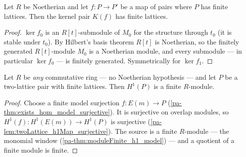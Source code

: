 \begin{lemma}
  \label{pa-lem:moduleFinite_aeval_kernelPair}
  \leanok

  Let \(R\) be Noetherian and let \(f : P \to P'\) be a map of pairs where \(P\) has
  finite lattices. Then the kernel pair \(K(f)\) has finite lattices.
\end{lemma}
\begin{proof}
  \leanok
  \(\ker f_0\) is an \(R[t]\)-submodule of \(M_0\) for the structure through \(t_0\)
  (it is stable under \(t_0\)). By Hilbert's basis theorem \(R[t]\) is Noetherian, so
  the finitely generated \(R[t]\)-module \(M_0\) is a Noetherian module, and every
  submodule --- in particular \(\ker f_0\) --- is finitely generated. Symmetrically
  for \(\ker f_1\).
\end{proof}

\begin{theorem}
  \label{pa-thm:twoLattice_coh1}
  \leanok

  Let \(R\) be \emph{any} commutative ring --- no Noetherian hypothesis --- and let
  \(P\) be a two-lattice pair with finite lattices. Then \(H^1(P)\) is a finite
  \(R\)-module.
\end{theorem}
\begin{proof}
  \leanok
  Choose a finite model surjection \(f : E(m) \to P\)
  (\ref{pa-thm:exists_hom_model_surjective}). It is surjective on overlap modules, so
  \(H^1(f) : H^1(E(m)) \to H^1(P)\) is surjective
  (\ref{pa-lem:twoLattice_h1Map_surjective}). The source is a finite \(R\)-module --- the
  monomial window (\ref{pa-thm:moduleFinite_h1_model}) --- and a quotient of a finite
  module is finite.
\end{proof}

